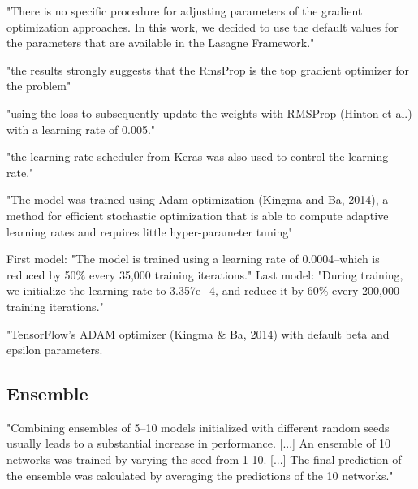 \documentclass[]{scrartcl}
\begin{document}
"There is no specific procedure for adjusting parameters of the gradient optimization approaches. In this work, we decided to use the default values for the parameters that are available in the Lasagne Framework." \cite{Hattori2017}

"the results strongly suggests that the RmsProp is the top gradient optimizer for the problem" \cite{Hattori2017}

"using the loss to subsequently update the weights with RMSProp (Hinton et al.) with a learning rate of 0.005." \cite{Jurtz2017}

"the learning rate scheduler from Keras was also used to control the learning rate." \cite{Fang2017}

"The model was trained using Adam optimization (Kingma and Ba, 2014), a method for efficient stochastic optimization that is able to compute adaptive learning rates and requires little hyper-parameter tuning" \cite{Heffernan2017}

First model:
"The model is trained using a learning rate of 0.0004–which is reduced by 50\% every 35,000 training iterations." \cite{Busia2017}
Last model:
"During training, we initialize the learning rate to 3.357e−4, and reduce it by 60\% every 200,000 training iterations." \cite{Busia2017}

"TensorFlow’s ADAM optimizer (Kingma \& Ba, 2014) with default beta and epsilon parameters. \cite{Busia2017}

\subsection{Ensemble}
"Combining ensembles of 5–10 models initialized with different random seeds usually leads to a substantial increase in performance. [...] An ensemble of 10 networks was trained by varying the seed from 1-10. [...] The final prediction of the ensemble was calculated by averaging the predictions of the 10 networks." \cite{Jurtz2017}
\end{document}
